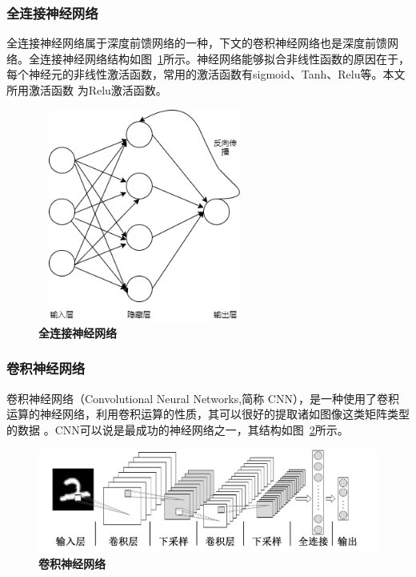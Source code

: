 \subsubsection{全连接神经网络}
全连接神经网络属于深度前馈网络的一种，下文的卷积神经网络也是深度前馈网络。全连接神经网络结构如图~\ref{fig:3-3}所示。神经网络能够拟合非线性函数的原因在于，每个神经元的非线性激活函数，常用的激活函数有sigmoid、Tanh、Relu等。本文所用激活函数
为Relu激活函数。
\begin{figure}[H]
  \centering
  \includegraphics[width=7cm,height=7cm]{fig/mlp.png}
  \caption{\textbf{全连接神经网络}}
  \label{fig:3-3}
\end{figure}

\subsubsection{卷积神经网络}
卷积神经网络（Convolutional Neural Networks,简称 CNN），是一种使用了卷积运算的神经网络，利用卷积运算的性质，其可以很好的提取诸如图像这类矩阵类型的数据
。CNN可以说是最成功的神经网络之一，其结构如图~\ref{fig:3-4}所示。
\begin{figure}[H]
  \centering
  \includegraphics[width=0.9\linewidth]{fig/cnn1.png}
  \caption{\textbf{卷积神经网络}}
  \label{fig:3-4}
\end{figure}

